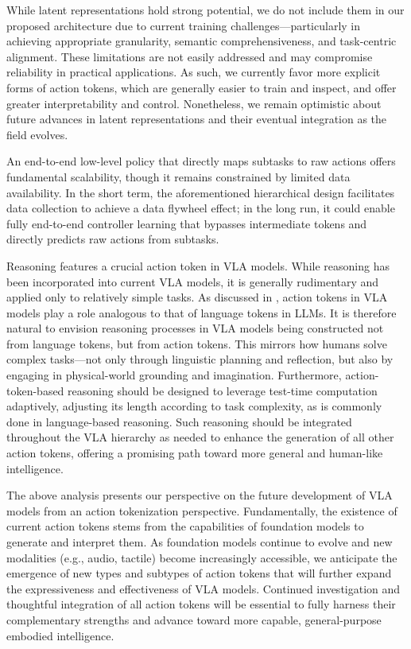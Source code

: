 \documentclass[10pt, a4paper, logo, copyright]{googledeepmind} %
\begin{document}
While latent representations hold strong potential, we do not include them in our proposed architecture due to current training challenges—particularly in achieving appropriate granularity, semantic comprehensiveness, and task-centric alignment. These limitations are not easily addressed and may compromise reliability in practical applications. As such, we currently favor more explicit forms of action tokens, which are generally easier to train and inspect, and offer greater interpretability and control. Nonetheless, we remain optimistic about future advances in latent representations and their eventual integration as the field evolves.

An end-to-end low-level policy that directly maps subtasks to raw actions offers fundamental scalability, though it remains constrained by limited data availability. In the short term, the aforementioned hierarchical design facilitates data collection to achieve a data flywheel effect; in the long run, it could enable fully end-to-end controller learning that bypasses intermediate tokens and directly predicts raw actions from subtasks.

Reasoning features a crucial action token in VLA models. While reasoning has been incorporated into current VLA models, it is generally rudimentary and applied only to relatively simple tasks. As discussed in , action tokens in VLA models play a role analogous to that of language tokens in LLMs. It is therefore natural to envision reasoning processes in VLA models being constructed not from language tokens, but from action tokens. This mirrors how humans solve complex tasks---not only through linguistic planning and reflection, but also by engaging in physical-world grounding and imagination. Furthermore, action-token-based reasoning should be designed to leverage test-time computation adaptively, adjusting its length according to task complexity, as is commonly done in language-based reasoning. Such reasoning should be integrated throughout the VLA hierarchy as needed to enhance the generation of all other action tokens, offering a promising path toward more general and human-like intelligence.

The above analysis presents our perspective on the future development of VLA models from an action tokenization perspective. Fundamentally, the existence of current action tokens stems from the capabilities of foundation models to generate and interpret them. As foundation models continue to evolve and new modalities (e.g., audio, tactile) become increasingly accessible, we anticipate the emergence of new types and subtypes of action tokens that will further expand the expressiveness and effectiveness of VLA models. Continued investigation and thoughtful integration of all action tokens will be essential to fully harness their complementary strengths and advance toward more capable, general-purpose embodied intelligence.
\end{document}
